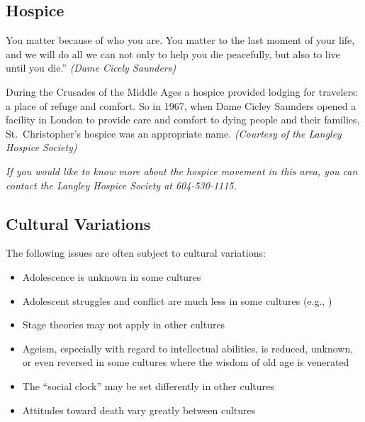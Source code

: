 \documentclass[
]{book}
\providecommand{\tightlist}{%
  \setlength{\itemsep}{0pt}\setlength{\parskip}{0pt}}
\begin{document}
\hypertarget{hospice}{%
\subsection*{Hospice}\label{hospice}}

You matter because of who you are. You matter to the last moment of your life, and we will do all we can not only to help you die peacefully, but also to live until you die.'' \emph{(Dame Cicely Saunders)}

During the Crusades of the Middle Ages a hospice provided lodging for travelers: a place of refuge and comfort. So in 1967, when Dame Cicley Saunders opened a facility in London to provide care and comfort to dying people and their families, St.~Christopher's hospice was an appropriate name. \emph{(Courtesy of the Langley Hospice Society)}

\emph{If you would like to know more about the hospice movement in this area, you can contact the Langley Hospice Society at 604-530-1115.}

\hypertarget{cultural-variations}{%
\subsection*{Cultural Variations}\label{cultural-variations}}

The following issues are often subject to cul­tural variations:

\begin{itemize}
\tightlist
\item
  Adolescence is unknown in some cultures\\
\item
  Adolescent struggles and conflict are much less in some cultures (e.g., )\\
\item
  Stage theories may not apply in other cultures\\
\item
  Ageism, especially with regard to intellectual abilities, is reduced, unknown, or even reversed in some cultures where the wisdom of old age is venerated\\
\item
  The ``social clock'' may be set differently in other cultures\\
\item
  Attitudes toward death vary greatly between cultures
\end{itemize}
\end{document}
